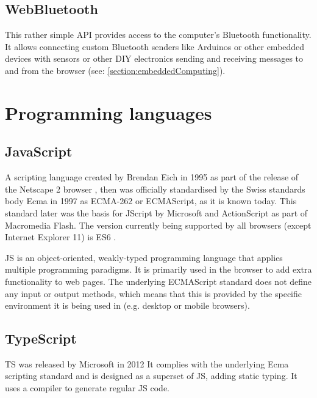 \subsection{WebBluetooth}

This rather simple \ac{API} provides access to the computer's Bluetooth functionality. It allows connecting custom Bluetooth senders like Arduinos or other embedded devices with sensors or other \ac{DIY} electronics sending and receiving messages to and from the browser (see: \autoref{section:embeddedComputing}).

\section{Programming languages}
\label{section:programmingLanguages}



\subsection{JavaScript}

A scripting language created by Brendan Eich in 1995 as part of the release of the Netscape 2 browser \parencite{javascriptRelease}, then was officially standardised by the Swiss standards body Ecma in 1997 as ECMA-262 or ECMAScript, as it is known today. This standard later was the basis for JScript by Microsoft and ActionScript as part of Macromedia Flash. The version currently being supported by all browsers (except Internet Explorer 11) is \ac{ES6} \parencite{javascriptHistory}.

\ac{JS} is an object-oriented, weakly-typed programming language that applies multiple programming paradigms. It is primarily used in the browser to add extra functionality to web pages. The underlying ECMAScript standard does not define any input or output methods, which means that this is provided by the specific environment it is being used in (e.g. desktop or mobile browsers).

\subsection{TypeScript}

\ac{TS} was released by Microsoft in 2012  It complies with the underlying Ecma scripting standard and is designed as a superset of \ac{JS}, adding static typing. It uses a compiler to generate regular \ac{JS} code.

